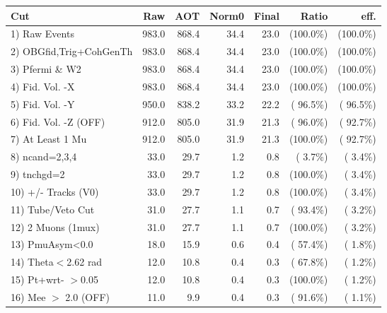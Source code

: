  \begin{table}[h!]\centering
 \begin{tabular}{||l||r|r|r|r|r|r||}
 \hline
 \hline
 Cut & Raw & AOT & Norm0 & Final & Ratio & eff.       \\
 \hline
  1) Raw Events           &        983.0 &        868.4 &         34.4 &         23.0 & (100.0\%) & (100.0\%) \\
  2) OBGfid,Trig+CohGenTh &        983.0 &        868.4 &         34.4 &         23.0 & (100.0\%) & (100.0\%) \\
  3) Pfermi \& W2         &        983.0 &        868.4 &         34.4 &         23.0 & (100.0\%) & (100.0\%) \\
  4) Fid. Vol. -X         &        983.0 &        868.4 &         34.4 &         23.0 & (100.0\%) & (100.0\%) \\
  5) Fid. Vol. -Y         &        950.0 &        838.2 &         33.2 &         22.2 & ( 96.5\%) & ( 96.5\%) \\
  6) Fid. Vol. -Z (OFF)   &        912.0 &        805.0 &         31.9 &         21.3 & ( 96.0\%) & ( 92.7\%) \\
  7) At Least 1 Mu        &        912.0 &        805.0 &         31.9 &         21.3 & (100.0\%) & ( 92.7\%) \\
  8) ncand=2,3,4          &         33.0 &         29.7 &          1.2 &          0.8 & (  3.7\%) & (  3.4\%) \\
  9) tnchgd=2             &         33.0 &         29.7 &          1.2 &          0.8 & (100.0\%) & (  3.4\%) \\
 10) +/- Tracks (V0)      &         33.0 &         29.7 &          1.2 &          0.8 & (100.0\%) & (  3.4\%) \\
 11) Tube/Veto Cut        &         31.0 &         27.7 &          1.1 &          0.7 & ( 93.4\%) & (  3.2\%) \\
 12) 2 Muons (1mux)       &         31.0 &         27.7 &          1.1 &          0.7 & (100.0\%) & (  3.2\%) \\
 13) PmuAsym<0.0          &         18.0 &         15.9 &          0.6 &          0.4 & ( 57.4\%) & (  1.8\%) \\
 14) Theta$<$2.62 rad     &         12.0 &         10.8 &          0.4 &          0.3 & ( 67.8\%) & (  1.2\%) \\
 15) Pt+wrt- $>$0.05      &         12.0 &         10.8 &          0.4 &          0.3 & (100.0\%) & (  1.2\%) \\
 16) Mee $>$ 2.0  (OFF)   &         11.0 &          9.9 &          0.4 &          0.3 & ( 91.6\%) & (  1.1\%) \\

\end{tabular}
\end{table}

